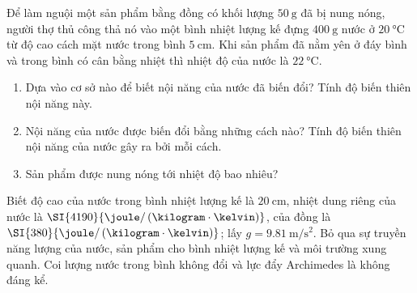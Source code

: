 \begin{vd}
	Để làm nguội một sản phẩm bằng đồng có khối lượng $\SI{50}{\gram}$ đã bị nung nóng, người thợ thủ công thả nó vào một bình nhiệt lượng kế đựng $\SI{400}{\gram}$ nước ở $\SI{20}{\celsius}$ từ độ cao cách mặt nước trong bình $\SI{5}{\centi\meter}$. Khi sản phẩm đã nằm yên ở đáy bình và trong bình có cân bằng nhiệt thì nhiệt độ của nước là $\SI{22}{\celsius}$.
	\begin{enumerate}[label=\alph*)]
		\item Dựa vào cơ sở nào để biết nội năng của nước đã biến đổi? Tính độ biến thiên nội năng này.
		\item Nội năng của nước được biến đổi bằng những cách nào? Tính độ biến thiên nội năng của nước gây ra bởi mỗi cách.
		\item Sản phẩm được nung nóng tới nhiệt độ bao nhiêu?
	\end{enumerate}
	Biết độ cao của nước trong bình nhiệt lượng kế là $\SI{20}{\centi\meter}$, nhiệt dung riêng của nước là $\SI{4190}{\joule/\left(\kilogram\cdot\kelvin\right)}$, của đồng là $\SI{380}{\joule/\left(\kilogram\cdot\kelvin\right)}$; lấy $g=\SI{9.81}{\meter/\second^2}$. Bỏ qua sự truyền năng lượng của nước, sản phẩm cho bình nhiệt lượng kế và môi trường xung quanh. Coi lượng nước trong bình không đổi và lực đẩy Archimedes là không đáng kể.
\end{vd}
